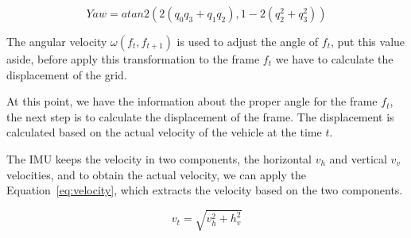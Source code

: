 \begin{equation}
\label{eq:quaternion}
Yaw=atan2(2(q_0 q_3+q_1 q_2),1-2(q_2^2+q_3^2))
\end{equation}

The angular velocity $\omega(f_t,f_{t+1})$ is used to adjust the angle of $f_t$, put this value aside, before apply this transformation to the frame $f_t$ we have to calculate the displacement of the grid.

At this point, we have the information about the proper angle for the frame $f_t$, the next step is to calculate the displacement of the frame. The displacement is calculated based on the actual velocity of the vehicle at the time $t$. 

The IMU keeps the velocity in two components, the horizontal $v_h$ and vertical $v_v$ velocities, and to obtain the actual velocity, we can apply the Equation~\ref{eq:velocity}, which extracts the velocity based on the two components.

\begin{equation}
\label{eq:velocity}
v_t=\sqrt{v_h^2+h_v^2}
\end{equation}











